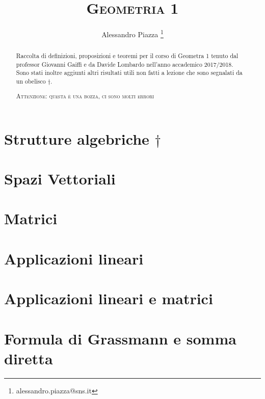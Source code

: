 \documentclass[9pt, a4paper]{article}
\title{\textsc{Geometria 1}}
\author{Alessandro Piazza \thanks{alessandro.piazza@sns.it}}
\theoremstyle{mythm}
\begin{document}
\maketitle

\begin{abstract}
	Raccolta di definizioni, proposizioni e teoremi per il corso di Geometra 1 tenuto dal professor Giovanni Gaiffi e da Davide Lombardo nell'anno accademico 2017/2018. \\
	Sono stati inoltre aggiunti altri risultati utili non fatti a lezione che sono segnalati da un obelisco $\dagger$. 
	\begin{center}
		\textsc{Attenzione: questa è una bozza, ci sono molti errori}
	\end{center}
\end{abstract}

\tableofcontents

\clearpage

\section{Strutture algebriche $\dagger$}


\clearpage

\section{Spazi Vettoriali}


\clearpage

\section{Matrici}


\clearpage

\section{Applicazioni lineari}


\clearpage

\section{Applicazioni lineari e matrici}


\clearpage

\section{Formula di Grassmann e somma diretta}

\end{document}
